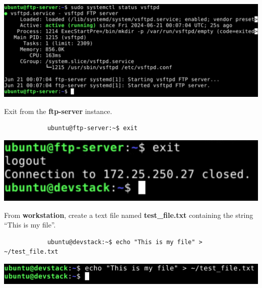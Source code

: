 \documentclass[letterpaper, 12pt]{article}
\begin{document}
\begin{enumerate}
\begin{labstep}
        \begin{center}
            \includegraphics[width=\linewidth]{images/part2/step16.png}
        \end{center}
    \end{labstep}

    \begin{labstep}
        Exit from the \textbf{ftp-server} instance.
        \begin{lstlisting}
            ubuntu@ftp-server:~$ exit
        \end{lstlisting}

        \begin{center}
            \includegraphics[width=\linewidth]{images/part2/step17.png}
        \end{center}
    \end{labstep}

    \begin{labstep}
        From \textbf{workstation}, create a text file named \textbf{test\_file.txt} containing the string ``This is my file''.
        \begin{lstlisting}
            ubuntu@devstack:~$ echo "This is my file" > ~/test_file.txt
        \end{lstlisting}

        \begin{center}
            \includegraphics[width=\linewidth]{images/part2/step18.png}
        \end{center}
    \end{labstep}


\end{enumerate}
\end{document}
